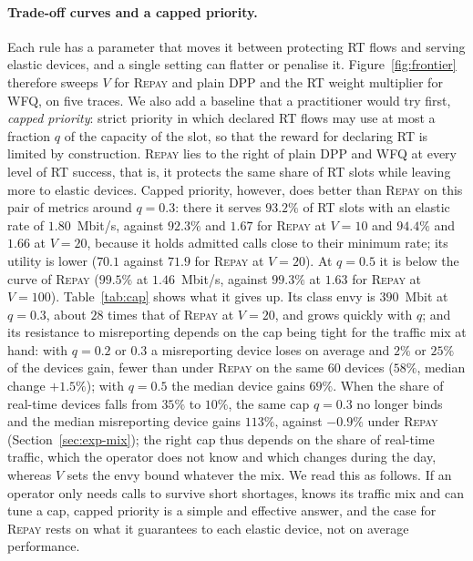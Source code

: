 \documentclass[preprint,11pt]{elsarticle}
\theoremstyle{definition}
\theoremstyle{remark}
\newcommand{\repay}{\textsc{Repay}}
\begin{document}
\paragraph{Trade-off curves and a capped priority.}
Each rule has a parameter that moves it between protecting RT flows and serving elastic devices, and a single setting can flatter or penalise it.
Figure~\ref{fig:frontier} therefore sweeps $V$ for \repay{} and plain DPP and the RT weight multiplier for \textsc{WFQ}, on five traces.
We also add a baseline that a practitioner would try first, \emph{capped priority}: strict priority in which declared RT flows may use at most a fraction $q$ of the capacity of the slot, so that the reward for declaring RT is limited by construction.
\repay{} lies to the right of plain DPP and \textsc{WFQ} at every level of RT success, that is, it protects the same share of RT slots while leaving more to elastic devices.
Capped priority, however, does better than \repay{} on this pair of metrics around $q=0.3$: there it serves $93.2\%$ of RT slots with an elastic rate of $1.80$~Mbit/s, against $92.3\%$ and $1.67$ for \repay{} at $V=10$ and $94.4\%$ and $1.66$ at $V=20$, because it holds admitted calls close to their minimum rate; its utility is lower ($70.1$ against $71.9$ for \repay{} at $V=20$). At $q=0.5$ it is below the curve of \repay{} ($99.5\%$ at $1.46$~Mbit/s, against $99.3\%$ at $1.63$ for \repay{} at $V=100$).
Table~\ref{tab:cap} shows what it gives up.
Its class envy is $390$~Mbit at $q=0.3$, about $28$ times that of \repay{} at $V=20$, and grows quickly with $q$; and its resistance to misreporting depends on the cap being tight for the traffic mix at hand: with $q=0.2$ or $0.3$ a misreporting device loses on average and $2\%$ or $25\%$ of the devices gain, fewer than under \repay{} on the same $60$ devices ($58\%$, median change $+1.5\%$); with $q=0.5$ the median device gains $69\%$.
When the share of real-time devices falls from $35\%$ to $10\%$, the same cap $q=0.3$ no longer binds and the median misreporting device gains $113\%$, against $-0.9\%$ under \repay{} (Section~\ref{sec:exp-mix}); the right cap thus depends on the share of real-time traffic, which the operator does not know and which changes during the day, whereas $V$ sets the envy bound whatever the mix.
We read this as follows. If an operator only needs calls to survive short shortages, knows its traffic mix and can tune a cap, capped priority is a simple and effective answer, and the case for \repay{} rests on what it guarantees to each elastic device, not on average performance.
\end{document}
